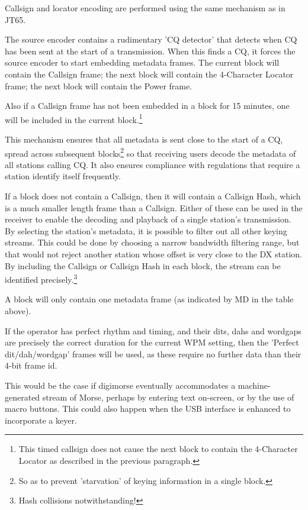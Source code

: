 \documentclass[a4paper]{tufte-handout}
\begin{document}
Callsign and locator encoding are performed using the same mechanism as in JT65.\cite{ClarkKarn1996}

The source encoder contains a rudimentary 'CQ detector' that detects when CQ has been sent at the start of a transmission. When this finds a CQ, it forces the source encoder to start embedding metadata frames. The current block will contain the Callsign frame; the next block will contain the 4-Character Locator frame; the next block will contain the Power frame.

Also if a Callsign frame has not been embedded in a block for 15 minutes, one will be included in the current block.\footnote{This timed callsign does not cause the next block to contain the 4-Character Locator as described in the previous paragraph.}

This mechanism ensures that all metadata is sent close to the start of a CQ, spread across subsequent blocks\footnote{So as to prevent 'starvation' of keying information in a single block.} so that receiving users decode the metadata of all stations calling CQ. It also ensures compliance with regulations that require a station identify itself frequently. 

If a block does not contain a Callsign, then it will contain a Callsign Hash, which is a much smaller length frame than a Callsign. Either of these can be used in the receiver to enable the decoding and playback of a single station's transmission. By selecting the station's metadata, it is possible to filter out all other keying streams. This could be done by choosing a narrow bandwidth filtering range, but that would not reject another station whose offset is very close to the DX station. By including the Callsign or Callsign Hash in each block, the stream can be identified precisely.\footnote{Hash collisions notwithstanding!}

A block will only contain one metadata frame (as indicated by MD in the table above). 


If the operator has perfect rhythm and timing, and their dits, dahs and wordgaps are precisely the correct duration for the current WPM setting, then the 'Perfect dit/dah/wordgap' frames will be used, as these require no further data than their 4-bit frame id.

This would be the case if digimorse eventually accommodates a machine-generated stream of Morse, perhaps by entering text on-screen, or by the use of macro buttons. This could also happen when the USB interface is enhanced to incorporate a keyer.
\end{document}
